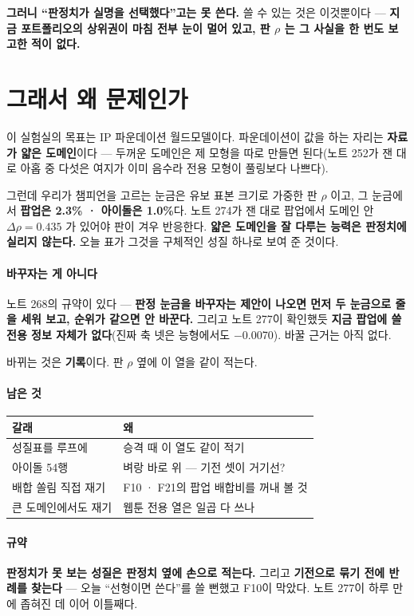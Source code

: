 \documentclass[10pt]{article}
\begin{document}
\textbf{그러니 ``판정치가 실명을 선택했다''고는 못 쓴다.} 쓸 수 있는 것은
이것뿐이다 --- \textbf{지금 포트폴리오의 상위권이 마침 전부 눈이 멀어 있고,
판 $\rho$ 는 그 사실을 한 번도 보고한 적이 없다.}

\section{그래서 왜 문제인가}

이 실험실의 목표는 IP 파운데이션 월드모델이다. 파운데이션이 값을 하는
자리는 \textbf{자료가 얇은 도메인}이다 --- 두꺼운 도메인은 제 모형을
따로 만들면 된다(노트 252가 잰 대로 아홉 중 다섯은 여지가 이미 음수라
전용 모형이 풀링보다 나쁘다).

그런데 우리가 챔피언을 고르는 눈금은 유보 표본 크기로 가중한 판 $\rho$ 이고,
그 눈금에서 \textbf{팝업은 2.3\% · 아이돌은 1.0\%}다. 노트 274가 잰 대로
팝업에서 도메인 안 $\Delta\rho{=}0.435$ 가 있어야 판이 겨우 반응한다.
\textbf{얇은 도메인을 잘 다루는 능력은 판정치에 실리지 않는다.} 오늘 표가
그것을 구체적인 성질 하나로 보여 준 것이다.

\paragraph{바꾸자는 게 아니다} 노트 268의 규약이 있다 --- \textbf{판정 눈금을
바꾸자는 제안이 나오면 먼저 두 눈금으로 줄을 세워 보고, 순위가 같으면 안
바꾼다.} 그리고 노트 277이 확인했듯 \textbf{지금 팝업에 쓸 전용 정보 자체가
없다}(진짜 축 넷은 능형에서도 $-$0.0070). 바꿀 근거는 아직 없다.

바뀌는 것은 \textbf{기록}이다. 판 $\rho$ 옆에 이 열을 같이 적는다.

\paragraph{남은 것}
\begin{center}\small
\begin{tabular}{ll}
\hline
갈래 & 왜 \\
\hline
성질표를 루프에 & 승격 때 이 열도 같이 적기 \\
아이돌 54행 & 벼랑 바로 위 --- 기전 셋이 거기선? \\
배합 쏠림 직접 재기 & F10 · F21의 팝업 배합비를 꺼내 볼 것 \\
큰 도메인에서도 재기 & 웹툰 전용 열은 일곱 다 쓰나 \\
\hline
\end{tabular}
\end{center}

\paragraph{규약} \textbf{판정치가 못 보는 성질은 판정치 옆에 손으로 적는다.}
그리고 \textbf{기전으로 묶기 전에 반례를 찾는다} --- 오늘 ``선형이면 쓴다''를
쓸 뻔했고 F10이 막았다. 노트 277이 하루 만에 좁혀진 데 이어 이틀째다.
\end{document}
